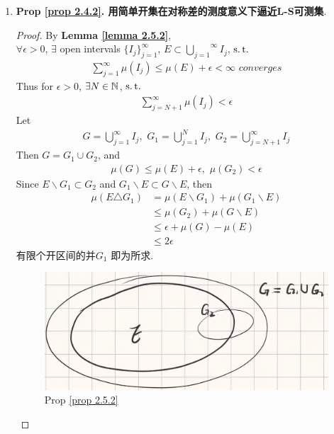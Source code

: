 \begin{enumerate}
		\newpage
		
		\item \textbf{Prop \ref{prop 2.4.2}. 用简单开集在对称差的测度意义下逼近L-S可测集}. \\
		\begin{proof}
			By \textbf{Lemma \ref{lemma 2.5.2}}, \\
			$\forall \epsilon > 0$, $\exists$ open intervals $\{ I_j \}_{j = 1}^{\infty}$, $E \subset \overset{\infty}{\underset{j = 1}{\bigcup}}{I_j}$, $\operatorname{s.t.}$
			\begin{align}
				\sum_{j = 1}^{\infty}{\mu(I_j)} \leq \mu(E) + \epsilon < \infty \,\, converges
			\end{align}
			Thus for $\epsilon > 0$, $\exists N \in \mathbb{N}$, $\operatorname{s.t.}$
			\begin{align}
				\sum_{j = N + 1}^{\infty}{\mu(I_j)} < \epsilon
			\end{align}
			Let 
			\begin{align}
				G = \bigcup_{j = 1}^{\infty}{I_j} ,\,\, 
				G_1 = \bigcup_{j = 1}^{N}{I_j} ,\,\, 
				G_2 = \bigcup_{j = N + 1}^{\infty}{I_j}
			\end{align}
			Then $G = G_1 \cup G_2$, and
			\begin{align}
				\mu(G) \leq \mu(E) + \epsilon , \,\, \mu(G_2) < \epsilon
			\end{align}
			Since $E \backslash G_1 \subset G_2$ and $G_1 \backslash E \subset G \backslash E$, then
			\begin{align}
				\mu(E \triangle G_1) 
				&= \mu(E \backslash G_1) + \mu(G_1 \backslash E) \\
				&\leq \mu(G_2) + \mu(G \backslash E) \\
				&\leq \epsilon + \mu(G) - \mu(E) \\
				&\leq 2\epsilon
			\end{align}
			有限个开区间的并$G_1$ 即为所求.
			
			\begin{figure}[thbp!]
				\centering
				\includegraphics[width=0.5\linewidth]{figure/1.5-2}
				\caption{Prop \ref{prop 2.5.2}}
				\label{pic : prop 1.4.2} %
			\end{figure}
		\end{proof}
	\end{enumerate}


